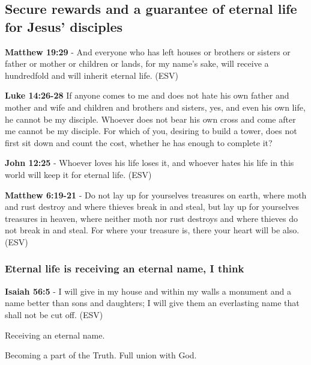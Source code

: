 \documentclass[11pt]{article}
\begin{document}
\subsection{Secure rewards and a guarantee of eternal life for Jesus' disciples}
\label{sec:org032697d}

\textbf{Matthew 19:29} - And everyone who has left houses or brothers or sisters or father or mother or children or lands, for my name's sake, will receive a hundredfold and will inherit eternal life. (ESV)

\textbf{Luke 14:26-28} If anyone comes to me and does not hate his own father and mother and wife and children and brothers and sisters, yes, and even his own life, he cannot be my disciple. Whoever does not bear his own cross and come after me cannot be my disciple. For which of you, desiring to build a tower, does not first sit down and count the cost, whether he has enough to complete it?

\textbf{John 12:25} - Whoever loves his life loses it, and whoever hates his life in this world will keep it for eternal life. (ESV)

\textbf{Matthew 6:19-21} - Do not lay up for yourselves treasures on earth, where moth and rust destroy and where thieves break in and steal, but lay up for yourselves treasures in heaven, where neither moth nor rust destroys and where thieves do not break in and steal. For where your treasure is, there your heart will be also. (ESV)

\subsubsection{Eternal life is receiving an eternal name, I think}
\label{sec:org91174a9}
\textbf{Isaiah 56:5} - I will give in my house and within my walls a monument and a name better than sons and daughters; I will give them an everlasting name that shall not be cut off. (ESV)

Receiving an eternal name.

Becoming a part of the Truth.
Full union with God.
\end{document}
